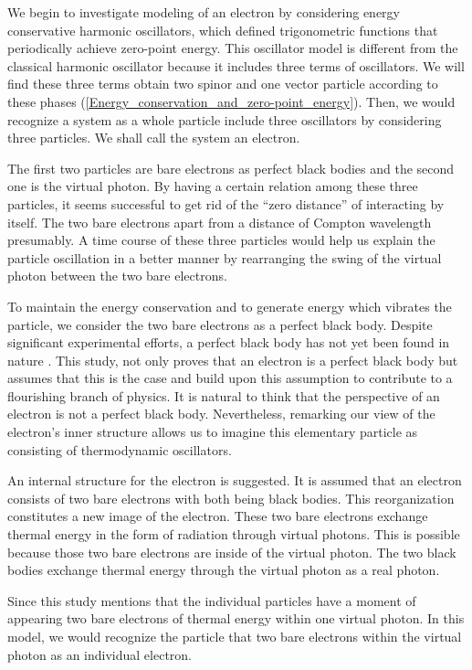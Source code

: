 \documentclass[%
 reprint,
 amsmath,amssymb,
 aps,
]{revtex4-1}
\numberwithin{equation}{section}
\begin{document}
    We begin to investigate modeling of an electron by considering energy conservative harmonic oscillators, which defined trigonometric functions that periodically achieve zero-point energy. This oscillator model is different from the classical harmonic oscillator because it includes three terms of oscillators. We will find these three terms obtain two spinor and one vector particle according to these phases (\ref{Energy_conservation_and_zero-point_energy}). Then, we would recognize a system as a whole particle include three oscillators by considering three particles. We shall call the system an electron.

    The first two particles are bare electrons as perfect black bodies and the second one is the virtual photon. By having a certain relation among these three particles, it seems successful to get rid of the ``zero distance'' of interacting by itself. The two bare electrons apart from a distance of Compton wavelength presumably. A time course of these three particles would help us explain the particle oscillation in a better manner by rearranging the swing of the virtual photon between the two bare electrons.

    To maintain the energy conservation and to generate energy which vibrates the particle, we consider the two bare electrons as a perfect black body. Despite significant experimental efforts, a perfect black body \cite{Planck} has not yet been found in nature \cite{Zu-Po Yang}. This study, not only proves that an electron is a perfect black body but assumes that this is the case and build upon this assumption to contribute to a flourishing branch of  physics. It is natural to think that the perspective of an electron is not a perfect black body. Nevertheless, remarking our view of the electron's inner structure allows us to imagine this elementary particle as consisting of thermodynamic oscillators.

    An internal structure for the electron is suggested. It is assumed that an electron consists of two bare electrons with both being black bodies. This reorganization constitutes a new image of the electron. These two bare electrons exchange thermal energy in the form of radiation through virtual photons. This is possible because those two bare electrons are inside of the virtual photon. The two black bodies exchange thermal energy through the virtual photon as a real photon.

    Since this study mentions that the individual particles have a moment of appearing two bare electrons of thermal energy within one virtual photon. In this model, we would recognize the particle that two bare electrons within the virtual photon as an individual electron.
\end{document}
